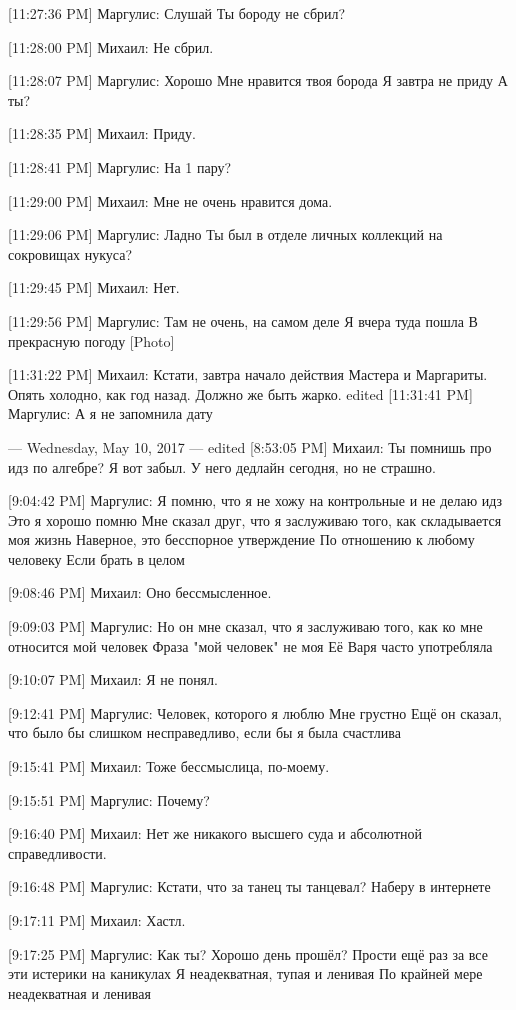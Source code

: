 \documentclass{article}
\begin{document}
[11:27:36 PM] Маргулис:
Слушай
 Ты бороду не сбрил?

[11:28:00 PM] Михаил:
Не сбрил.

[11:28:07 PM] Маргулис:
Хорошо
 Мне нравится твоя борода
 Я завтра не приду
 А ты?

[11:28:35 PM] Михаил:
Приду.

[11:28:41 PM] Маргулис:
На 1 пару?

[11:29:00 PM] Михаил:
Мне не очень нравится дома.

[11:29:06 PM] Маргулис:
Ладно
 Ты был в отделе личных коллекций на сокровищах нукуса?

[11:29:45 PM] Михаил:
Нет.

[11:29:56 PM] Маргулис:
Там не очень, на самом деле
 Я вчера туда пошла
 В прекрасную погоду
 [Photo]

[11:31:22 PM] Михаил:
Кстати, завтра начало действия Мастера и Маргариты. Опять холодно, как год назад. Должно же быть жарко.
edited 
[11:31:41 PM] Маргулис:
А я не запомнила дату

--- Wednesday, May 10, 2017 ---
edited 
[8:53:05 PM] Михаил:
Ты помнишь про идз по алгебре? Я вот забыл. У него дедлайн сегодня, но не страшно.

[9:04:42 PM] Маргулис:
Я помню, что я не хожу на контрольные и не делаю идз
 Это я хорошо помню
 Мне сказал друг, что я заслуживаю того, как складывается моя жизнь
 Наверное, это бесспорное утверждение
 По отношению к любому человеку
 Если брать в целом

[9:08:46 PM] Михаил:
Оно бессмысленное.

[9:09:03 PM] Маргулис:
Но он мне сказал, что я заслуживаю того, как ко мне относится мой человек
 Фраза "мой человек" не моя
 Её Варя часто употребляла

[9:10:07 PM] Михаил:
Я не понял.

[9:12:41 PM] Маргулис:
Человек, которого я люблю
 Мне грустно
 Ещё он сказал, что было бы слишком несправедливо, если бы я была счастлива

[9:15:41 PM] Михаил:
Тоже бессмыслица, по-моему.

[9:15:51 PM] Маргулис:
Почему?

[9:16:40 PM] Михаил:
Нет же никакого высшего суда и абсолютной справедливости.

[9:16:48 PM] Маргулис:
Кстати, что за танец ты танцевал?
 Наберу в интернете

[9:17:11 PM] Михаил:
Хастл.

[9:17:25 PM] Маргулис:
Как ты? Хорошо день прошёл?
 Прости ещё раз за все эти истерики на каникулах
 Я неадекватная, тупая и ленивая
 По крайней мере неадекватная и ленивая
\end{document}
